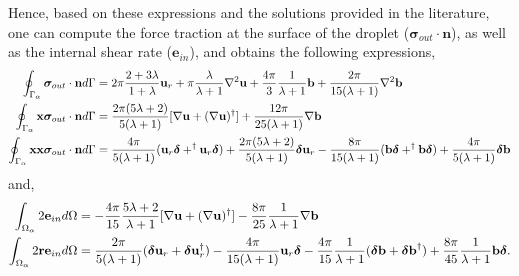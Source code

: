 Hence, based on these expressions and the solutions  provided in the literature, one can compute the force traction at the surface of the droplet ($\bm\sigma_{out}\cdot \textbf{n}$), as well as the internal shear rate ($\textbf{e}_{in}$), and obtains the following expressions, 
\begin{align}
    \oint_{\Gamma_{\alpha}} \bm\sigma_{out}\cdot \textbf{n} d\Gamma &
    =
    2\pi\frac{2+3\lambda}{1+\lambda}\textbf{u}_r
    + \pi \frac{\lambda}{\lambda +1} \mathbf{\nabla}^2 \textbf{u}
    +
    \frac{4\pi}{3}\frac{1}{\lambda +1}\textbf{b}
    + \frac{2\pi}{15(\lambda +1)}\mathbf{\nabla}^2\textbf{b}
    \\
    \oint_{\Gamma_{\alpha}}  \textbf{x}\bm\sigma_{out}\cdot \textbf{n} d\Gamma &
    =
    \frac{2\pi(5\lambda +2)}{5(\lambda +1)}[\mathbf{\nabla} \textbf{u}+ (\mathbf{\nabla} \textbf{u})^\dagger]
    + \frac{12\pi}{25(\lambda +1)} \mathbf{\nabla} \textbf{b} 
    \\
    \oint_{\Gamma_{\alpha}} \textbf{xx}\bm\sigma_{out}\cdot \textbf{n} d\Gamma &
    =
    \frac{4\pi}{5(\lambda +1)} (\textbf{u}_r \bm\delta + ^\dagger\textbf{u}_r \bm\delta)
    + \frac{2\pi(5\lambda +2)}{5(\lambda+1)}\bm\delta \textbf{u}_r
    - \frac{8\pi}{15(\lambda +1)} ( \textbf{b}\bm\delta + ^\dagger\textbf{b}\bm\delta )
    + \frac{4\pi}{5(\lambda+1)}\bm\delta \textbf{b}
\end{align}
and, 
\begin{align}
    \int_{\Omega_{\alpha}} 2\textbf{e}_{in} d\Omega
    &=
    -\frac{4\pi}{15}\frac{5\lambda +2}{\lambda+1}
    [\mathbf{\nabla} \textbf{u}+ (\mathbf{\nabla} \textbf{u})^\dagger]
    - \frac{8\pi}{25}\frac{1}{\lambda+1}
    \mathbf{\nabla}\textbf{b}
    \\
    \int_{\Omega_{\alpha}} 2\textbf{r}\textbf{e}_{in} d\Omega
    &=
    \frac{2\pi}{5(\lambda+1)}
    (\bm\delta \textbf{u}_r +  \bm\delta\textbf{u}_r^\dagger)
    -\frac{4\pi}{15(\lambda+1)}\textbf{u}_r\bm\delta 
    -\frac{4\pi}{15}\frac{1}{\lambda+1}
    (\bm\delta \textbf{b} +  \bm\delta\textbf{b}^\dagger)
    +\frac{8\pi}{45}\frac{1}{\lambda+1}
    \textbf{b}\bm\delta. 
\end{align}
